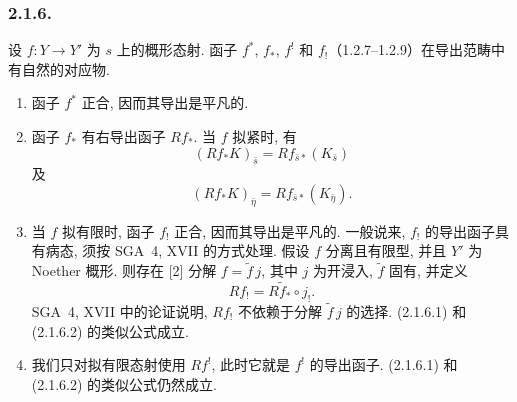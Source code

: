 \subsubsection*{2.1.6.}
设 $f:Y\longrightarrow Y'$ 为 $s$ 上的概形态射. 函子 $f^*$, $f_*$, $f^!$ 和 $f_!$（1.2.7--1.2.9）在导出范畴中有自然的对应物.
\begin{enumerate}[label=\alph*)]
\item 函子 $f^*$ 正合, 因而其导出是平凡的.

\item 函子 $f_*$ 有右导出函子 $Rf_*$. 当 $f$ 拟紧时, 有
\begin{equation}\tag{2.1.6.1}
(Rf_*K)_{\bar s}=Rf_{\bar s*}(K_{\bar s})
\end{equation}
及
\begin{equation}\tag{2.1.6.2}
(Rf_*K)_{\bar\eta}=Rf_{\bar s*}(K_{\bar\eta}).
\end{equation}

\item 当 $f$ 拟有限时, 函子 $f_!$ 正合, 因而其导出是平凡的. 一般说来, $f_!$ 的导出函子具有病态, 须按 SGA~4, XVII 的方式处理. 假设 $f$ 分离且有限型, 并且 $Y'$ 为 Noether 概形. 则存在 [2] 分解 $f=\widetilde f\,j$, 其中 $j$ 为开浸入, $\widetilde f$ 固有, 并定义
\begin{equation*}
Rf_!=R\widetilde f_*\circ j_!.
\end{equation*}
SGA~4, XVII 中的论证说明, $Rf_!$ 不依赖于分解 $\widetilde f\,j$ 的选择. (2.1.6.1) 和 (2.1.6.2) 的类似公式成立.

\item 我们只对拟有限态射使用 $Rf^!$, 此时它就是 $f^!$ 的导出函子. (2.1.6.1) 和 (2.1.6.2) 的类似公式仍然成立.
\end{enumerate}
